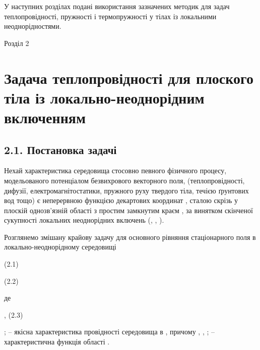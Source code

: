 У наступних розділах подані використання зазначених методик для задач
теплопровідності, пружності і термопружності у тілах із локальними
неоднорідностями.

Розділ 2

\hypertarget{ux437ux430ux434ux430ux447ux430-ux442ux435ux43fux43bux43eux43fux440ux43eux432ux456ux434ux43dux43eux441ux442ux456-ux434ux43bux44f-ux43fux43bux43eux441ux43aux43eux433ux43e-ux442ux456ux43bux430-ux456ux437-ux43bux43eux43aux430ux43bux44cux43dux43e-ux43dux435ux43eux434ux43dux43eux440ux456ux434ux43dux438ux43c-ux432ux43aux43bux44eux447ux435ux43dux43dux44fux43c}{%
\section{Задача теплопровідності для плоского тіла із
локально-неоднорідним
включенням}\label{ux437ux430ux434ux430ux447ux430-ux442ux435ux43fux43bux43eux43fux440ux43eux432ux456ux434ux43dux43eux441ux442ux456-ux434ux43bux44f-ux43fux43bux43eux441ux43aux43eux433ux43e-ux442ux456ux43bux430-ux456ux437-ux43bux43eux43aux430ux43bux44cux43dux43e-ux43dux435ux43eux434ux43dux43eux440ux456ux434ux43dux438ux43c-ux432ux43aux43bux44eux447ux435ux43dux43dux44fux43c}}

\hypertarget{ux43fux43eux441ux442ux430ux43dux43eux432ux43aux430-ux437ux430ux434ux430ux447ux456}{%
\subsection{2.1. Постановка
задачі}\label{ux43fux43eux441ux442ux430ux43dux43eux432ux43aux430-ux437ux430ux434ux430ux447ux456}}

Нехай характеристика середовища стосовно певного фізичного процесу,
модельованого потенціалом безвихрового векторного поля,
(теплопровідності, дифузії, електромагнітостатики, пружного руху
твердого тіла, течією ґрунтових вод тощо) є неперервною функцією
декартових координат , сталою скрізь у плоскій однозв'язній області з
простим замкнутим краєм , за винятком скінченої сукупності локальних
неоднорідних включень (, , ).

Розглянемо змішану крайову задачу для основного рівняння стаціонарного
поля в локально-неоднорідному середовищі

(2.1)

(2.2)

де

, (2.3)

; -- якісна характеристика провідності середовища в , причому , , ; --
характеристична функція області .

